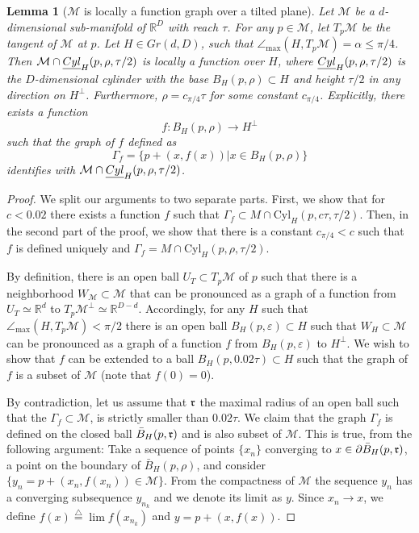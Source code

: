 \documentclass[12pt]{article}
\newtheorem{Lemma}[Theorem]{Lemma}
\theoremstyle{remark}
\newcommand{\RR}{\mathbb{R}}
\newcommand{\MM}{\mathcal{M}}
\newcommand{\eps}{\varepsilon}
\newcommand{\defeq}{\stackrel{\bigtriangleup}{=}}
\newcommand{\maxangle}{\angle_{\max}}
\begin{document}
\begin{appendices}
\begin{Lemma} [$\MM$ is locally a function graph over a tilted plane]\label{lem:M_is_locally_a_fuinction_clean}
Let $\MM$ be a $d$-dimensional sub-manifold of $\RR^D$ with reach $\tau$. For any $p \in \MM$, let $T_{p}\MM$ be the tangent of $\MM$ at $p$. Let $H \in Gr(d,D)$, such that $\maxangle(H,T_p\MM) = \alpha \leq \pi/4$.  
Then $\MM \cap \emph{Cyl}_H(p,\rho, \tau/2)$ is locally a function over $H$, where $\emph{Cyl}_H(p,\rho, \tau/2)$ is the $D$-dimensional cylinder with the base $B_H(p, \rho)\subset H$ and height $\tau/2$ in any direction on $H^\perp$. 
Furthermore, $\rho = c_{\pi/4}\tau$ for some constant $c_{\pi/4}$. Explicitly, there exists a function 
$$
f:B_H(p, \rho) \to H^\perp
$$
such that the graph of $f$ defined as
$$
\Gamma_f = \{p + (x,f(x)) | x\in B_H(p, \rho) \} 
$$
identifies with $\MM \cap \emph{Cyl}_H(p,\rho, \tau/2)$.
\end{Lemma}
\begin{proof}
We split our arguments to two separate parts.
First, we show that for $c < 0.02$ there exists a function $f$ such that $\Gamma_f \subset M\cap \textrm{Cyl}_H(p,  c \tau, \tau/2)$.
Then, in the second part of the proof, we show that there is a constant $c_{\pi/4} < c$ such that $f$ is defined uniquely and $\Gamma_f = M\cap \textrm{Cyl}_H(p, \rho, \tau/2)$.

By definition, there is an open ball $U_T\subset T_p\MM$ of $p$ such that there is a neighborhood $W_\MM \subset \MM$ that can be pronounced as a graph of a function from $U_T\simeq \RR^d$ to $T_p\MM^\perp\simeq \RR^{D-d}$.
Accordingly, for any $H$ such that $\maxangle(H, T_p\MM) < \pi/2$ there is an open ball $B_H(p,\eps) \subset H$ such that $W_H \subset \MM$ can be pronounced as a graph of a function $f$  from $B_H(p,\eps)$ to $H^\perp$.
We wish to show that $f$ can be extended to a ball $B_H(p, 0.02 \tau)\subset H$ such that the graph of $f$ is a subset of $\MM$ (note that $f(0) = 0$).

By contradiction, let us assume that $\frak{r}$ the maximal radius of an open ball such that the $\Gamma_f \subset \MM$, is strictly smaller than $0.02 \tau$.
We claim that the graph $\Gamma_f$ is defined on the closed ball $\bar B_H(p, \frak{r})$ and is also subset of $\MM$.
This is true, from the following argument:
Take a sequence of points $\{x_n\}$ converging to $ x\in \partial \bar B_H(p, \frak{r})$, a point on the boundary of $\bar B_H(p, \rho)$, and consider $\{y_n = p + (x_n, f(x_n))\in \MM\}$. From the compactness of $\MM$ the sequence $y_n$ has a converging subsequence $y_{n_k}$ and we denote its limit as $y$.
Since $x_n \to x$, we define $f(x)\defeq\lim f(x_{n_k})$ and  $y = p + (x, f(x))$.


\end{proof}
\end{appendices}
\end{document}

